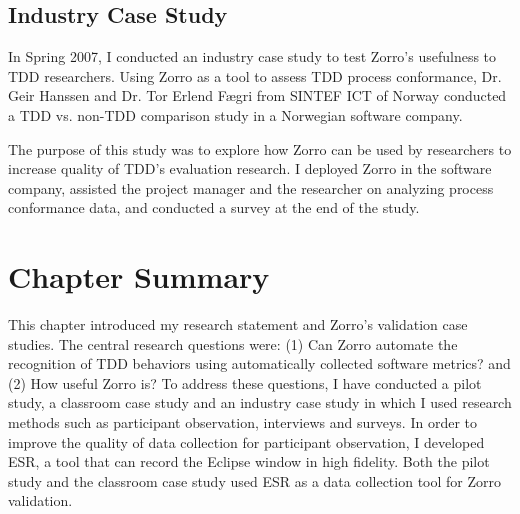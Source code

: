 
\subsection{Industry Case Study}
In Spring 2007, I conducted an industry case study to test Zorro's usefulness to TDD researchers. Using Zorro as a tool to assess TDD process conformance, Dr. Geir Hanssen and Dr. Tor Erlend F{\ae}gri from SINTEF ICT of Norway conducted a TDD vs. non-TDD comparison study in a Norwegian software company.

\begin{comment}
I focused on the research question Q2 to evaluate Zorro's usefulness
in this study. The specific questions were:
\begin{itemize}
\item Question Q3a: Can Zorro be deployed? 
\item Question Q3b: Does Zorro infer the TDD behaviors correctly as
participants' perception?
\item Question Q3c: Are Zorro's TDD analyses useful for participants?
\item Question Q3d: How can Zorro be used to assist TDD research?
\end{itemize}
\end{comment}

The purpose of this study was to explore how Zorro can be used by researchers to increase quality of TDD's evaluation research. I deployed Zorro in the software company, assisted the project manager and the researcher on analyzing process conformance data, and conducted a survey at the end of the study. 


\section{Chapter Summary}
This chapter introduced my research statement and Zorro's validation case studies. The central research questions were: (1) Can Zorro automate the recognition of TDD behaviors using automatically collected software metrics? and (2) How useful Zorro is?  To address these questions, I have conducted a pilot study, a classroom case study and an industry case study in which I used research methods such as participant observation, interviews and surveys. In order to improve the quality of data collection for participant observation, I developed ESR, a tool that can record the Eclipse window in high fidelity. Both the pilot study and the classroom case study used ESR as a data collection tool for Zorro validation. 

